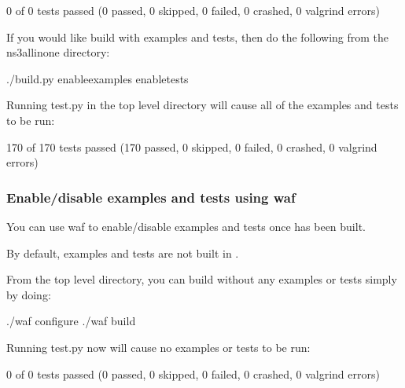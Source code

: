 \documentclass[letterpaper,10pt,english]{sphinxmanual}
\begin{document}
\begin{sphinxVerbatim}[commandchars=\\\{\}]
0 of 0 tests passed (0 passed, 0 skipped, 0 failed, 0 crashed, 0 valgrind errors)
\end{sphinxVerbatim}

If you would like build  with examples and tests, then do the following from the ns\sphinxhyphen{}3\sphinxhyphen{}allinone directory:

\begin{sphinxVerbatim}[commandchars=\\\{\}]
\PYGZdl{} ./build.py \PYGZhy{}\PYGZhy{}enable\PYGZhy{}examples \PYGZhy{}\PYGZhy{}enable\PYGZhy{}tests
\end{sphinxVerbatim}

Running test.py in the top level  directory will cause all of the examples and tests to be run:

\begin{sphinxVerbatim}[commandchars=\\\{\}]
170 of 170 tests passed (170 passed, 0 skipped, 0 failed, 0 crashed, 0 valgrind errors)
\end{sphinxVerbatim}


\subsubsection{Enable/disable examples and tests using waf}
\label{\detokenize{enable-tests:enable-disable-examples-and-tests-using-waf}}
You can use waf to enable/disable examples and tests once  has been built.

By default, examples and tests are not built in .

From the top level  directory, you can build  without any
examples or tests simply by doing:

\begin{sphinxVerbatim}[commandchars=\\\{\}]
\PYGZdl{} ./waf configure
\PYGZdl{} ./waf build
\end{sphinxVerbatim}

Running test.py now will cause no examples or tests to be run:

\begin{sphinxVerbatim}[commandchars=\\\{\}]
0 of 0 tests passed (0 passed, 0 skipped, 0 failed, 0 crashed, 0 valgrind errors)
\end{sphinxVerbatim}
\end{document}
